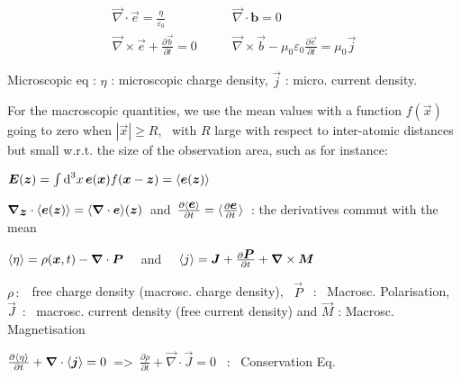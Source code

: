 \begin{squishlist}
\item[] $$\boxed{\begin{split}
	\vec{\nabla}\cdot\vec{e} = \frac{\eta}{\varepsilon_0}  \qquad &\vec{\nabla} \cdot \boldsymbol{b} = 0\\
	\vec{\nabla}\times \vec{e} + \frac{\partial\vec{b}}{\partial t} =0 \qquad & \vec{\nabla} \times \vec{b} - \mu_0 \varepsilon_0 \frac{\partial \vec{e}}{\partial t} = \mu_0 \vec{j}
	\end{split}}$$
\item[] Microscopic eq : $\eta$ : microscopic charge density, $\vec{j}$ : micro. current density.

\item[] For the macroscopic quantities, we use the mean values with a function $f(\vec{x})$ going to zero when $|\vec{x}| \geq R$, \, with $R$ large with respect to inter-atomic distances but small w.r.t. the size of the observation area, such as for instance:

\item $\mbox{\boldmath$E$}(\mbox{\boldmath$z$}) = \int \textrm{d} ^3x \, \mbox{\boldmath$e$}(\mbox{\boldmath$x$})f(\mbox{\boldmath$x$}-\mbox{\boldmath$z$}) =  \langle\mbox{\boldmath$e$}(\mbox{\boldmath$z$})\rangle$

\item $\mbox{\boldmath$\nabla$}_{\mbox{\boldmath$z$}} \cdot \langle\mbox{\boldmath$e$}(\mbox{\boldmath$z$})\rangle = \langle\mbox{\boldmath$\nabla$} \cdot \mbox{\boldmath$e$}\rangle(\mbox{\boldmath$z$}) \, $ and  $\, \frac{\partial \langle\mbox{\boldmath$e$}\rangle}{\partial t} = \langle\frac{\partial \mbox{\boldmath$e$}}{\partial t}\rangle \,$ : the derivatives commut with the mean

\item $\langle\eta\rangle = \rho(\mbox{\boldmath$x$},t) - \mbox{\boldmath$\nabla$}\cdot\mbox{\boldmath$P$} \quad$ and  $\quad \langle j\rangle = \mbox{\boldmath$J$} + \frac{\partial \mbox{\boldmath$P$}}{\partial t} + \mbox{\boldmath$\nabla$} \times \mbox{\boldmath$M$}$

\item $\rho \, :$ \, free charge density (macrosc. charge density), \, $\vec{P}$ \, : \, Macrosc. Polarisation, \, $\vec{J} \,$ : \, macrosc. current density (free current density) and $\vec{M}$ : Macrosc. Magnetisation

\item $\frac{\partial \langle\eta\rangle}{\partial t} + \mbox{\boldmath$\nabla$}\cdot\langle\mbox{\boldmath$j$}\rangle = 0 \,$ => $\, \frac{\partial \rho}{\partial t} + \vec{\nabla}\cdot\vec{J} = 0$ \, : \, Conservation Eq.
\end{squishlist}
